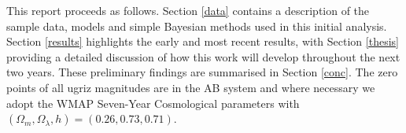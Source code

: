 \documentclass{mn2e}
\begin{document}




This report proceeds as follows. Section \ref{data} contains a description of the sample data, models and simple Bayesian methods used in this initial analysis. Section \ref{results} highlights the early and most recent results, with Section \ref{thesis} providing a detailed discussion of how this work will develop throughout the next two years. These preliminary findings are summarised in Section \ref{conc}. The zero points of all ugriz magnitudes are in the AB system and where necessary we adopt the WMAP Seven-Year Cosmological parameters \citep{WMAP} with $(\Omega_m, \Omega_{\lambda}, h) = (0.26, 0.73, 0.71)$. 
\end{document}
